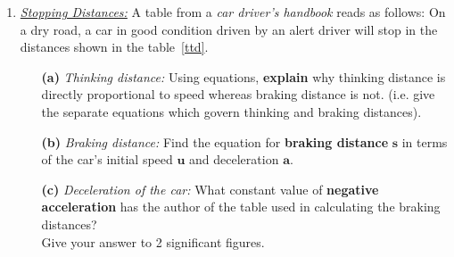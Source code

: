 \documentclass[A4,12pt]{article}
\begin{document}
\begin{enumerate}[label=\bfseries (\arabic*)]
\item \href{https://isaacphysics.org/questions/stopping_distances?board=5d4ec03d-877c-47a9-bda2-014e9a488970}{\it Stopping Distances:} A table from a \textit{car driver's handbook} reads as follows: On a dry road, a car in good condition driven by an alert driver will stop in the distances shown in the table~\ref{ttd}. \cite{Jardine-Wright}
%
\begin{table}[H]
    \centering
    \caption{The Thinking Distance is the distance travelled by the car during the driver's reaction time. The Braking Distance is the distance in which the car stops after the brakes have been applied.}
    \label{ttd}
\end{table}
%
%
\begin{itemize}
    \item[\bf (a)] {\it Thinking distance:} Using equations, {\bf explain} why thinking distance is directly proportional to speed whereas braking distance is not. (i.e. give the separate equations which govern thinking and braking distances).
    \item[\bf (b)] {\it Braking distance:} Find the equation for {\bf braking distance} $\bm s$ in terms of the car's initial speed $\bm u$ and deceleration $\bm a$.
    \item[\bf (c)] {\it Deceleration of the car:}  What constant value of {\bf negative acceleration} has the author of the table used in calculating the braking distances?\\ Give your answer to 2 significant figures.

\end{itemize}
\end{enumerate}
\end{document}
